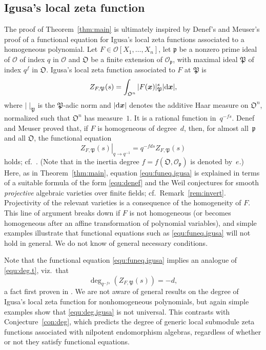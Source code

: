 \documentclass[11pt]{amsart}
\numberwithin{equation}{section}
\numberwithin{figure}{section}
\theoremstyle{plain}
\theoremstyle{definition}
\theoremstyle{remark}
\begin{document}
\subsection{Igusa's local zeta function} \label{subsec:ilzf} The proof
of Theorem~\ref{thm:main} is ultimately inspired by Denef's and
Meuser's proof of a functional equation for Igusa's local zeta
functions associated to a homogeneous polynomial. Let
$F\in{\ensuremath{\mathcal{O}}}[X_1,\dots,X_n]$, let ${\mathfrak{p}}$ be a nonzero prime ideal of
${\ensuremath{\mathcal{O}}}$ of index $q$ in ${\ensuremath{\mathcal{O}}}$ and ${\mathfrak O}$ be a finite extension of
${\ensuremath{\mathcal{O}}}_{\mathfrak{p}}$, with maximal ideal ${\mathfrak{P}}$ of index $q^f$ in
${\mathfrak O}$. Igusa's local zeta function associated to $F$ at ${\mathfrak{P}}$
is $$Z_{F,{\mathfrak{P}}}(s) = \int_{{\mathfrak O}^n}|F({{\boldsymbol{x}}})|_{\mathfrak{P}}^s |{\textup{d}} {{\boldsymbol{x}}}|,$$
where $|\;|_{\mathfrak{P}}$ is the ${\mathfrak{P}}$-adic norm and $|{\textup{d}} {{\boldsymbol{x}}}|$ denotes
the additive Haar measure on ${\mathfrak O}^n$, normalized such that ${\mathfrak O}^n$
has measure~$1$. It is a rational function in~$q^{-fs}$. Denef and
Meuser proved that, if $F$ is homogeneous of degree~$d$, then, for
almost all~${\mathfrak{p}}$ and all ${\mathfrak O}$, the functional equation
\begin{equation}\label{equ:funeq.igusa}
  \left. Z_{F,{\mathfrak{P}}}(s)\right|_{q {\rightarrow} q^{-1}} = q^{-fds}Z_{F,{\mathfrak{P}}}(s)
\end{equation}
holds; cf.\ \cite[Theorem~4]{DenefMeuser/91}. (Note that in
\cite{DenefMeuser/91} the inertia degree $f=f({\mathfrak O},{\ensuremath{\mathcal{O}}}_{\mathfrak{p}})$ is
denoted by~$e$.) Here, as in Theorem~\ref{thm:main}, equation
\eqref{equ:funeq.igusa} is explained in terms of a suitable formula of
the form \eqref{equ:denef} and the Weil conjectures for smooth
\emph{projective} algebraic varieties over finite fields;
cf.\ Remark~\ref{rem:invert}. Projectivity of the relevant varieties
is a consequence of the homogeneity of $F$. This line of argument
breaks down if $F$ is not homogeneous (or becomes homogeneous after an
affine transformation of polynomial variables), and simple examples
illustrate that functional equations such as \eqref{equ:funeq.igusa}
will not hold in general. We do not know of general necessary
conditions.

Note that the functional equation \eqref{equ:funeq.igusa} implies an
analogue of \eqref{equ:deg.t}, viz.\ that
\begin{equation}\label{equ:deg.igusa}
  \deg_{q^{-fs}}(Z_{F,{\mathfrak{P}}}(s))=-d,
\end{equation}
a fact first proven in \cite{Denef/87}. We are not aware of general
results on the degree of Igusa's local zeta function for
nonhomogeneous polynomials, but again simple examples show that
\eqref{equ:deg.igusa} is not universal. This contrasts with
Conjecture~\ref{con:deg}, which predicts the degree of generic local
submodule zeta functions associated with nilpotent endomorphism
algebras, regardless of whether or not they satisfy functional
equations.
\end{document}
